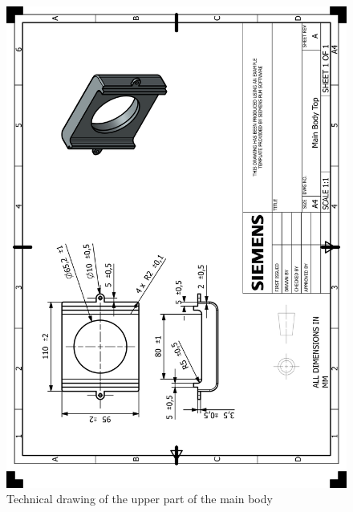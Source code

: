 \documentclass[12pt]{report}
\begin{document}
\begin{appendices}
\begin{figure}[H]
    \centering
    \includegraphics[width=\textwidth]{HP_Main Body Top.png} 
    \caption{Technical drawing of the upper part of the main body}
    \label{fig:technical-drawing}
\end{figure}


\end{appendices}
\end{document}
